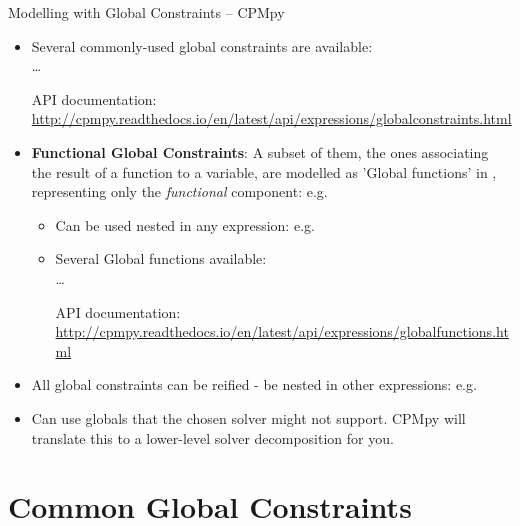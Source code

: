 \documentclass{cons-beamer}
\begin{document}
\begin{flashcardcpmpy}
\begin{frame}{Modelling with Global Constraints -- CPMpy}
  \begin{itemize}
    \item Several commonly-used global constraints are available: \\  \dots
      \begin{footnotesize}
        API documentation: \\ \url{http://cpmpy.readthedocs.io/en/latest/api/expressions/globalconstraints.html}
      \end{footnotesize} \vfill
    \item \textbf{Functional Global Constraints}: A subset of them, the ones associating the result of a function to a variable, are modelled as 'Global functions' in \CPMpy, representing only the \textit{functional} component: e.g. 
    \begin{itemize}
      \item Can be used nested in any expression: e.g. 
      \item Several Global functions available: \\  \dots 
        \begin{footnotesize}
          API documentation: \\ \url{http://cpmpy.readthedocs.io/en/latest/api/expressions/globalfunctions.html}
        \end{footnotesize}
    \end{itemize} \vfill
    \item All global constraints can be reified - be nested in other expressions: e.g. \\
       \vfill
    \item Can use globals that the chosen solver might not support. CPMpy will translate this to a lower-level solver decomposition for you.
  \end{itemize}
\end{frame}
\end{flashcardcpmpy}

\section{Common Global Constraints}
\end{document}
